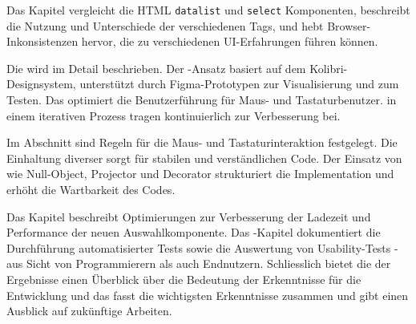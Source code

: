 Das Kapitel \textbf{} vergleicht die HTML \texttt{datalist} und \texttt{select} Komponenten, beschreibt die Nutzung und Unterschiede der verschiedenen Tags, 
und hebt Browser-Inkonsistenzen hervor, die zu verschiedenen UI-Erfahrungen führen können.

Die \textbf{} wird im Detail beschrieben.
Der \textbf{}-Ansatz basiert auf dem Kolibri-Designsystem, unterstützt durch Figma-Prototypen zur Visualisierung und zum Testen.
Das \textbf{} optimiert die Benutzerführung für Maus- und Tastaturbenutzer.
\textbf{} in einem iterativen Prozess tragen kontinuierlich zur Verbesserung bei.

Im Abschnitt \textbf{} sind Regeln für die Maus- und Tastaturinteraktion festgelegt.
Die Einhaltung diverser \textbf{} sorgt für stabilen und verständlichen Code.
Der Einsatz von \textbf{} wie Null-Object, Projector und Decorator strukturiert die Implementation und erhöht die Wartbarkeit des Codes.

Das Kapitel \textbf{} beschreibt Optimierungen zur Verbesserung der Ladezeit und Performance der neuen Auswahlkomponente.
Das \textbf{}-Kapitel dokumentiert die Durchführung automatisierter Tests sowie die Auswertung von Usability-Tests - aus Sicht von Programmierern als auch Endnutzern.
Schliesslich bietet die \textbf{} der Ergebnisse einen Überblick über die Bedeutung der Erkenntnisse für die Entwicklung 
und das \textbf{} fasst die wichtigsten Erkenntnisse zusammen und gibt einen Ausblick auf zukünftige Arbeiten.
